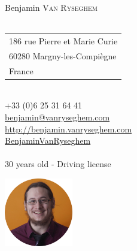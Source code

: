 \documentclass{curve}
\title{}
\begin{document}

\begin{minipage}{7cm}
\large
Benjamin \textsc{Van Ryseghem}\\
\normalsize
\\
{ \begin{tabular}{@{}l}
186 rue Pierre et Marie Curie\\
60280 Margny-les-Compiègne\\
France
\end{tabular}}\\

{ +33 (0)6 25 31 64 41}\\
\href{mailto:benjamin@vanryseghem.com}{ benjamin@vanryseghem.com}\\
\href{http://benjamin.vanryseghem.com}{ \url{http://benjamin.vanryseghem.com}}\\
\href{https://github.com/BenjaminVanRyseghem}{ BenjaminVanRyseghem}\\
\\30 years old - Driving license
\end{minipage}
\hfill
\begin{minipage}{7cm}
  \begin{flushright}
  \includegraphics[height=3cm]{Moi}
  \end{flushright}
\end{minipage}
\maketitle
\vspace{-1cm}
\end{document}
